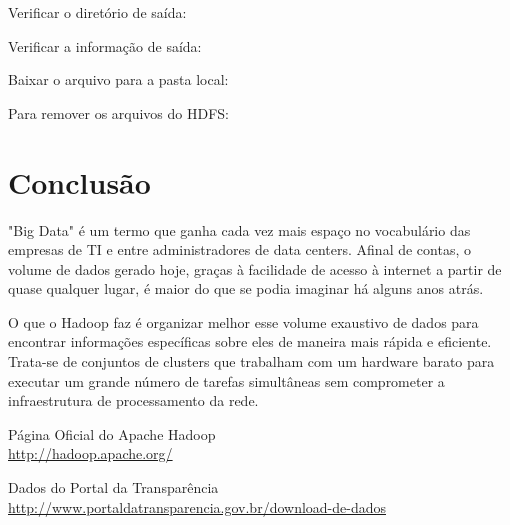 \documentclass[a4paper,11pt]{article}
\begin{document}
Verificar o diretório de saída: \\

Verificar a informação de saída: \\

Baixar o arquivo para a pasta local: \\

Para remover os arquivos do HDFS: \\

\section{Conclusão}
"Big Data" é um termo que ganha cada vez mais espaço no vocabulário das empresas de TI e entre administradores de data centers. Afinal de contas, o volume de dados gerado hoje, graças à facilidade de acesso à internet a partir de quase qualquer lugar, é maior do que se podia imaginar há alguns anos atrás.

O que o Hadoop faz é organizar melhor esse volume exaustivo de dados para encontrar informações específicas sobre eles de maneira mais rápida e eficiente. Trata-se de conjuntos de clusters que trabalham com um hardware barato para executar um grande número de tarefas simultâneas sem comprometer a infraestrutura de processamento da rede. 



\begin{thebibliography}{5}
	Página Oficial do Apache Hadoop \\
	\url{http://hadoop.apache.org/}
	
	Dados do Portal da Transparência \\
	\url{http://www.portaldatransparencia.gov.br/download-de-dados}
	
    
\end{thebibliography}
\end{document}
